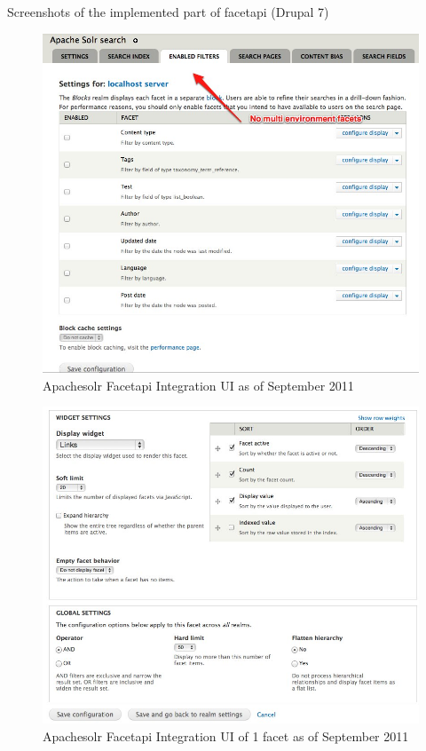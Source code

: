 Screenshots of the implemented part of facetapi (Drupal 7)
\begin{figure}[H]
     \includegraphics[width=\textwidth]{images/facetapI_ui_september_2011.jpg}
     \caption{Apachesolr Facetapi Integration UI as of September 2011}
\end{figure}

\begin{figure}[H]
     \includegraphics[width=\textwidth]{images/facetapi_ui_facet_september_2011.jpg}
     \caption{Apachesolr Facetapi Integration UI of 1 facet as of September 2011}
\end{figure}


